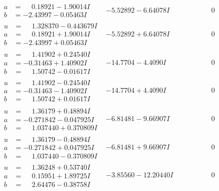 \documentclass[1p]{elsarticle_modified}
\theoremstyle{definition}
\begin{document}
$$\begin{array}{c|c|c}
\begin{aligned}
a &= \phantom{-}0.18921 - 1.90014 I \\
b &= -2.43997 - 0.05463 I\end{aligned}
 & -5.52892 - 6.64078 I & \phantom{-0.000000 } 0 \\ \hline\begin{aligned}
u &= \phantom{-}1.328370 - 0.443679 I \\
a &= \phantom{-}0.18921 + 1.90014 I \\
b &= -2.43997 + 0.05463 I\end{aligned}
 & -5.52892 + 6.64078 I & \phantom{-0.000000 } 0 \\ \hline\begin{aligned}
u &= \phantom{-}1.41902 + 0.24540 I \\
a &= -0.31463 + 1.40902 I \\
b &= \phantom{-}1.50742 - 0.01617 I\end{aligned}
 & -14.7704 - 4.4090 I & \phantom{-0.000000 } 0 \\ \hline\begin{aligned}
u &= \phantom{-}1.41902 - 0.24540 I \\
a &= -0.31463 - 1.40902 I \\
b &= \phantom{-}1.50742 + 0.01617 I\end{aligned}
 & -14.7704 + 4.4090 I & \phantom{-0.000000 } 0 \\ \hline\begin{aligned}
u &= \phantom{-}1.36179 + 0.48894 I \\
a &= -0.271842 - 0.047925 I \\
b &= \phantom{-}1.037440 + 0.370809 I\end{aligned}
 & -6.81481 - 9.66907 I & \phantom{-0.000000 } 0 \\ \hline\begin{aligned}
u &= \phantom{-}1.36179 - 0.48894 I \\
a &= -0.271842 + 0.047925 I \\
b &= \phantom{-}1.037440 - 0.370809 I\end{aligned}
 & -6.81481 + 9.66907 I & \phantom{-0.000000 } 0 \\ \hline\begin{aligned}
u &= \phantom{-}1.36248 + 0.53740 I \\
a &= \phantom{-}0.15951 + 1.89725 I \\
b &= \phantom{-}2.64476 - 0.38758 I\end{aligned}
 & -3.85560 - 12.20440 I & \phantom{-0.000000 } 0\\

\end{array}$$
\end{document}
